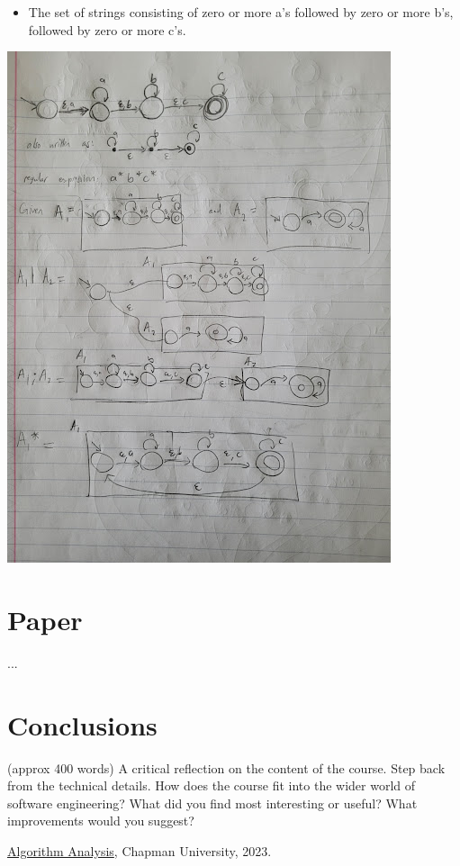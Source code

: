 \documentclass{article}
\theoremstyle{theorem}
\theoremstyle{definition}
\theoremstyle{remark}
\begin{document}
\begin{itemize}
    \item The set of strings consisting of zero or more a's followed by zero or more b's, followed by zero or more c's.
\end{itemize}
\includegraphics{Report Images/HW11_5.jpg}
\section{Paper}

...

\section{Conclusions}\label{conclusions}

(approx 400 words) A critical reflection on the content of the course. Step back from the technical details. How does the course fit into the wider world of software engineering? What did you find most interesting or useful? What improvements would you suggest?

\begin{thebibliography}{99}
 \href{https://github.com/alexhkurz/algorithm-analysis-2023}{Algorithm Analysis}, Chapman University, 2023.
\end{thebibliography}
\end{document}
